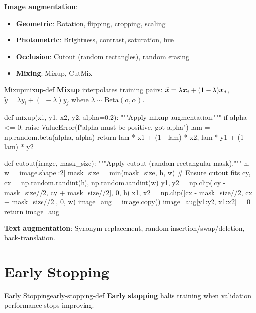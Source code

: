 \documentclass[../../main.tex]{subfiles}
\begin{document}
\textbf{Image augmentation}:
\begin{itemize}
    \item \textbf{Geometric}: Rotation, flipping, cropping, scaling
    \item \textbf{Photometric}: Brightness, contrast, saturation, hue
    \item \textbf{Occlusion}: Cutout (random rectangles), random erasing
    \item \textbf{Mixing}: Mixup, CutMix
\end{itemize}

\begin{definition}{Mixup}{mixup-def}
\textbf{Mixup} interpolates training pairs: $\tilde{\boldsymbol{x}} = \lambda \boldsymbol{x}_i + (1-\lambda)\boldsymbol{x}_j$, $\tilde{y} = \lambda y_i + (1-\lambda)y_j$ where $\lambda \sim \text{Beta}(\alpha, \alpha)$.
\end{definition}

\begin{pythoncode}
def mixup(x1, y1, x2, y2, alpha=0.2):
    """Apply mixup augmentation."""
    if alpha <= 0:
        raise ValueError(f"alpha must be positive, got {alpha}")
    lam = np.random.beta(alpha, alpha)
    return lam * x1 + (1 - lam) * x2, lam * y1 + (1 - lam) * y2

def cutout(image, mask_size):
    """Apply cutout (random rectangular mask)."""
    h, w = image.shape[:2]
    mask_size = min(mask_size, h, w)  # Ensure cutout fits
    cy, cx = np.random.randint(h), np.random.randint(w)
    y1, y2 = np.clip([cy - mask_size//2, cy + mask_size//2], 0, h)
    x1, x2 = np.clip([cx - mask_size//2, cx + mask_size//2], 0, w)
    image_aug = image.copy()
    image_aug[y1:y2, x1:x2] = 0
    return image_aug
\end{pythoncode}

\textbf{Text augmentation}: Synonym replacement, random insertion/swap/deletion, back-translation.

\section{Early Stopping}
\label{sec:early-stopping}

\begin{definition}{Early Stopping}{early-stopping-def}
\textbf{Early stopping} halts training when validation performance stops improving.
\end{definition}
\end{document}

